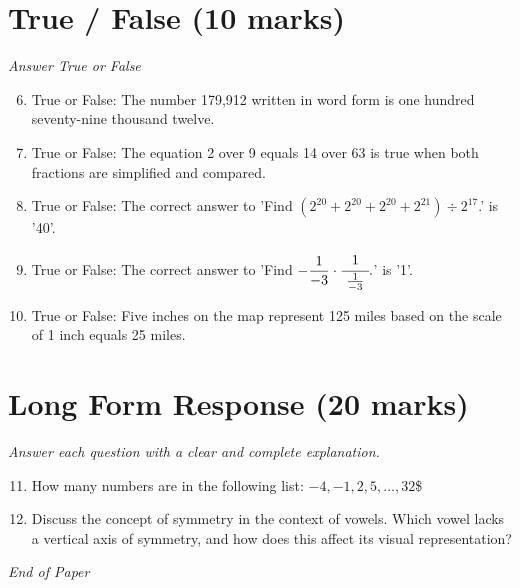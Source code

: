 \documentclass[12pt]{article}
\begin{document}
\section*{True / False (10 marks)}
\textit{Answer True or False}
\begin{enumerate}[label=\arabic*.]
\setcounter{enumi}{5}
\item True or False: The number 179,912 written in word form is one hundred seventy-nine thousand twelve.
\item True or False: The equation 2 over 9 equals 14 over 63 is true when both fractions are simplified and compared.
\item True or False: The correct answer to 'Find $(2^{20} + 2^{20} + 2^{20} +2^{21}) \div 2^{17}$.' is '40'.
\item True or False: The correct answer to 'Find $-\dfrac{1}{-3}\cdot\cfrac{1}{~\frac{1}{-3}~}.$' is '1'.
\item True or False: Five inches on the map represent 125 miles based on the scale of 1 inch equals 25 miles.
\end{enumerate}

\section*{Long Form Response (20 marks)}
\textit{Answer each question with a clear and complete explanation.}
\begin{enumerate}[label=\arabic*.]
\setcounter{enumi}{10}
\item How many numbers are in the following list: $-4, -1, 2, 5,\ldots, 32$\$
\item Discuss the concept of symmetry in the context of vowels. Which vowel lacks a vertical axis of symmetry, and how does this affect its visual representation?
\end{enumerate}

\vfill
\noindent\textit{End of Paper}
\end{document}
